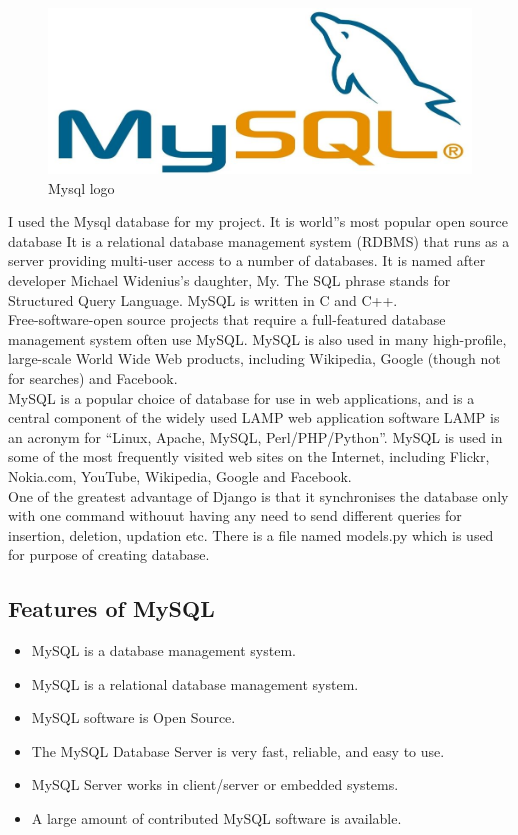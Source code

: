 \begin{figure}[h]
\centering \includegraphics[scale=0.2]{images/mysql.jpg}
\caption{Mysql logo}
\end{figure}
\noindent I used the Mysql database for my project. It is world''s most popular open source database It 
is a relational database management system (RDBMS) that runs as a server 
providing multi-user access to a number of databases. It is named after 
developer Michael Widenius's daughter, My. The SQL phrase stands for
Structured Query Language. MySQL is written in C and C++.\\

\noindent Free-software-open source projects that require a 
full-featured database management system
often use MySQL. MySQL is also used in many high-profile, large-scale World 
Wide Web products, including
Wikipedia, Google (though not for searches) and Facebook.\\

\noindent MySQL is a popular choice of database for use in web 
applications, and is a central component of the widely used LAMP web 
application software LAMP is an acronym for “Linux, Apache, MySQL, 
Perl/PHP/Python”. MySQL is used in some of the most frequently visited web sites 
on the Internet, including Flickr, Nokia.com, YouTube, Wikipedia, Google 
and Facebook.\\

\noindent One of the greatest advantage of Django is that it synchronises the 
database only with one command withouut having any need to send 
different queries for insertion, deletion, updation etc. There is a 
file named models.py which is used for purpose of creating database.
\subsection{Features of MySQL}
\begin{itemize}
\item MySQL is a database management system.
\item MySQL is a relational database management system.
\item MySQL software is Open Source.
\item The MySQL Database Server is very fast, reliable, and easy to 
use.
\item MySQL Server works in client/server or embedded systems.
\item A large amount of contributed MySQL software is available.
\end{itemize}
